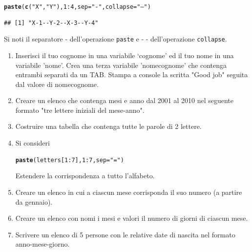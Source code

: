 \documentclass[onecolumn,12pt]{book}\usepackage[]{graphicx}\usepackage[]{color}
\makeatletter
\newcommand{\hlnum}[1]{\textcolor[rgb]{0.686,0.059,0.569}{#1}}%
\newcommand{\hlstr}[1]{\textcolor[rgb]{0.192,0.494,0.8}{#1}}%
\newcommand{\hlopt}[1]{\textcolor[rgb]{0,0,0}{#1}}%
\newcommand{\hlstd}[1]{\textcolor[rgb]{0.345,0.345,0.345}{#1}}%
\newcommand{\hlkwc}[1]{\textcolor[rgb]{0.333,0.667,0.333}{#1}}%
\newcommand{\hlkwd}[1]{\textcolor[rgb]{0.737,0.353,0.396}{\textbf{#1}}}%
\newenvironment{kframe}{%
 \def\at@end@of@kframe{}%
 \ifinner\ifhmode%
  \def\at@end@of@kframe{\end{minipage}}%
  \begin{minipage}{\columnwidth}%
 \fi\fi%
 \def\FrameCommand##1{\hskip\@totalleftmargin \hskip-\fboxsep
 \colorbox{shadecolor}{##1}\hskip-\fboxsep
     \hskip-\linewidth \hskip-\@totalleftmargin \hskip\columnwidth}%
 \MakeFramed {\advance\hsize-\width
   \@totalleftmargin\z@ \linewidth\hsize
   \@setminipage}}%
 {\par\unskip\endMakeFramed%
 \at@end@of@kframe}
\newenvironment{knitrout}{}{} %
\makeatother
\begin{document}
\begin{knitrout}
\color{fgcolor}\begin{kframe}
\begin{alltt}
\hlkwd{paste}\hlstd{(}\hlkwd{c}\hlstd{(}\hlstr{"X"}\hlstd{,} \hlstr{"Y"}\hlstd{),} \hlnum{1}\hlopt{:}\hlnum{4}\hlstd{,} \hlkwc{sep} \hlstd{=} \hlstr{"-"}\hlstd{,} \hlkwc{collapse} \hlstd{=} \hlstr{"--"}\hlstd{)}
\end{alltt}
\begin{verbatim}
## [1] "X-1--Y-2--X-3--Y-4"
\end{verbatim}
\end{kframe}
\end{knitrout}
Si noti il separatore - dell'operazione \texttt{paste} e  - - dell'operazione \texttt{collapse}.

 \begin{shaded}
 \begin{enumerate}
 \item{} Inserisci il tuo cognome in una variabile `cognome' ed il tuo nome in una variabile 'nome'. Crea una terza variabile 'nomecognome' che contenga entrambi separati da un TAB. Stampa a console la scritta "Good job" seguita dal valore di nomecognome.
  \item{} Creare un elenco che contenga mesi e anno dal 2001 al 2010 nel seguente formato "tre lettere iniziali del mese-anno".
 \item{} Costruire una tabella che contenga tutte le parole di 2 lettere.
\item{}
Si consideri
\begin{knitrout}
\color{fgcolor}\begin{kframe}
\begin{alltt}
\hlkwd{paste}\hlstd{(letters[}\hlnum{1}\hlopt{:}\hlnum{7}\hlstd{],}\hlnum{1}\hlopt{:}\hlnum{7}\hlstd{,}\hlkwc{sep}\hlstd{=}\hlstr{"="}\hlstd{)}
\end{alltt}
\end{kframe}
\end{knitrout}
Estendere la corrispondenza a tutto l'alfabeto.
\item Creare un elenco in cui a ciascun mese corrisponda il suo numero (a partire da gennaio).
\item Creare un elenco con nomi i mesi e valori il numero di giorni di ciascun mese.
\item Scrivere un elenco di 5 persone con le relative date di nascita nel formato anno-mese-giorno.
 \end{enumerate}
 \end{shaded}
\end{document}
